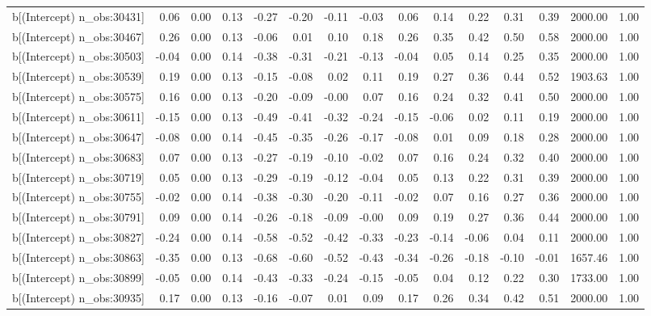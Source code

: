\begin{table}[ht]
\begin{tabular}{rrrrrrrrrrrrrrr}
  b[(Intercept) n\_obs:30431] & 0.06 & 0.00 & 0.13 & -0.27 & -0.20 & -0.11 & -0.03 & 0.06 & 0.14 & 0.22 & 0.31 & 0.39 & 2000.00 & 1.00 \\ 
  b[(Intercept) n\_obs:30467] & 0.26 & 0.00 & 0.13 & -0.06 & 0.01 & 0.10 & 0.18 & 0.26 & 0.35 & 0.42 & 0.50 & 0.58 & 2000.00 & 1.00 \\ 
  b[(Intercept) n\_obs:30503] & -0.04 & 0.00 & 0.14 & -0.38 & -0.31 & -0.21 & -0.13 & -0.04 & 0.05 & 0.14 & 0.25 & 0.35 & 2000.00 & 1.00 \\ 
  b[(Intercept) n\_obs:30539] & 0.19 & 0.00 & 0.13 & -0.15 & -0.08 & 0.02 & 0.11 & 0.19 & 0.27 & 0.36 & 0.44 & 0.52 & 1903.63 & 1.00 \\ 
  b[(Intercept) n\_obs:30575] & 0.16 & 0.00 & 0.13 & -0.20 & -0.09 & -0.00 & 0.07 & 0.16 & 0.24 & 0.32 & 0.41 & 0.50 & 2000.00 & 1.00 \\ 
  b[(Intercept) n\_obs:30611] & -0.15 & 0.00 & 0.13 & -0.49 & -0.41 & -0.32 & -0.24 & -0.15 & -0.06 & 0.02 & 0.11 & 0.19 & 2000.00 & 1.00 \\ 
  b[(Intercept) n\_obs:30647] & -0.08 & 0.00 & 0.14 & -0.45 & -0.35 & -0.26 & -0.17 & -0.08 & 0.01 & 0.09 & 0.18 & 0.28 & 2000.00 & 1.00 \\ 
  b[(Intercept) n\_obs:30683] & 0.07 & 0.00 & 0.13 & -0.27 & -0.19 & -0.10 & -0.02 & 0.07 & 0.16 & 0.24 & 0.32 & 0.40 & 2000.00 & 1.00 \\ 
  b[(Intercept) n\_obs:30719] & 0.05 & 0.00 & 0.13 & -0.29 & -0.19 & -0.12 & -0.04 & 0.05 & 0.13 & 0.22 & 0.31 & 0.39 & 2000.00 & 1.00 \\ 
  b[(Intercept) n\_obs:30755] & -0.02 & 0.00 & 0.14 & -0.38 & -0.30 & -0.20 & -0.11 & -0.02 & 0.07 & 0.16 & 0.27 & 0.36 & 2000.00 & 1.00 \\ 
  b[(Intercept) n\_obs:30791] & 0.09 & 0.00 & 0.14 & -0.26 & -0.18 & -0.09 & -0.00 & 0.09 & 0.19 & 0.27 & 0.36 & 0.44 & 2000.00 & 1.00 \\ 
  b[(Intercept) n\_obs:30827] & -0.24 & 0.00 & 0.14 & -0.58 & -0.52 & -0.42 & -0.33 & -0.23 & -0.14 & -0.06 & 0.04 & 0.11 & 2000.00 & 1.00 \\ 
  b[(Intercept) n\_obs:30863] & -0.35 & 0.00 & 0.13 & -0.68 & -0.60 & -0.52 & -0.43 & -0.34 & -0.26 & -0.18 & -0.10 & -0.01 & 1657.46 & 1.00 \\ 
  b[(Intercept) n\_obs:30899] & -0.05 & 0.00 & 0.14 & -0.43 & -0.33 & -0.24 & -0.15 & -0.05 & 0.04 & 0.12 & 0.22 & 0.30 & 1733.00 & 1.00 \\ 
  b[(Intercept) n\_obs:30935] & 0.17 & 0.00 & 0.13 & -0.16 & -0.07 & 0.01 & 0.09 & 0.17 & 0.26 & 0.34 & 0.42 & 0.51 & 2000.00 & 1.00 \\ 

\end{tabular}
\end{table}

